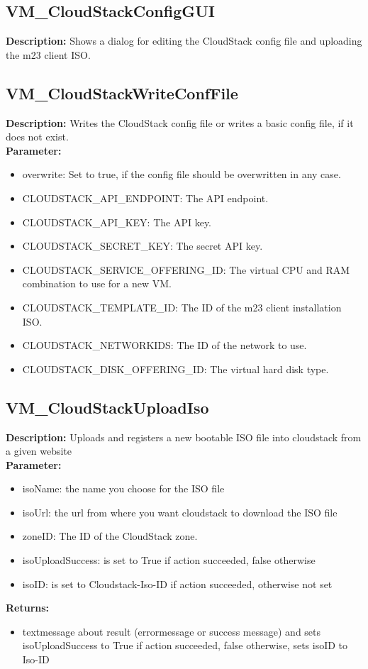 \subsection{VM\_CloudStackConfigGUI}
\textbf{Description:} Shows a dialog for editing the CloudStack config file and uploading the m23 client ISO.\\

\subsection{VM\_CloudStackWriteConfFile}
\textbf{Description:} Writes the CloudStack config file or writes a basic config file, if it does not exist.\\
\textbf{Parameter:}
\begin{itemize}
\item overwrite: Set to true, if the config file should be overwritten in any case.
\item CLOUDSTACK\_API\_ENDPOINT: The API endpoint.
\item CLOUDSTACK\_API\_KEY: The API key.
\item CLOUDSTACK\_SECRET\_KEY: The secret API key.
\item CLOUDSTACK\_SERVICE\_OFFERING\_ID: The virtual CPU and RAM combination to use for a new VM.
\item CLOUDSTACK\_TEMPLATE\_ID: The ID of the m23 client installation ISO.
\item CLOUDSTACK\_NETWORKIDS: The ID of the network to use.
\item CLOUDSTACK\_DISK\_OFFERING\_ID: The virtual hard disk type.
\end{itemize}

\subsection{VM\_CloudStackUploadIso}
\textbf{Description:} Uploads and registers a new bootable ISO file into cloudstack from a given website\\
\textbf{Parameter:}
\begin{itemize}
\item isoName: the name you choose for the ISO file 
\item isoUrl: the url from where you want cloudstack to download the ISO file
\item zoneID: The ID of the CloudStack zone.
\item isoUploadSuccess: is set to True if action succeeded, false otherwise
\item isoID: is set to Cloudstack-Iso-ID if action succeeded, otherwise not set
\end{itemize}
\textbf{Returns:}
\begin{itemize}
\item textmessage about result (errormessage or success message) and sets isoUploadSuccess to True if action succeeded, false otherwise, sets isoID to Iso-ID
\end{itemize}

